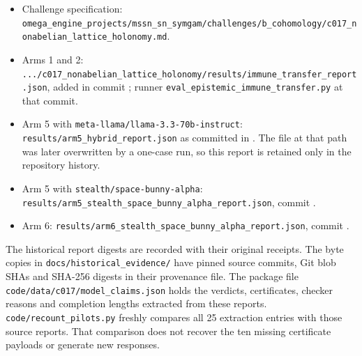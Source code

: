 \documentclass[
  11pt,
]{article}
\providecommand{\tightlist}{%
  \setlength{\itemsep}{0pt}\setlength{\parskip}{0pt}}
\begin{document}
\begin{itemize}
\tightlist
\item
  Challenge specification:
  \texttt{omega\_\allowbreak{}engine\_\allowbreak{}projects/\allowbreak{}mssn\_\allowbreak{}sn\_\allowbreak{}symgam/\allowbreak{}challenges/\allowbreak{}b\_\allowbreak{}cohomology/\allowbreak{}c017\_\allowbreak{}nonabelian\_\allowbreak{}lattice\_\allowbreak{}holonomy.md}.
\item
  Arms 1 and 2:
  \texttt{.../\allowbreak{}c017\_\allowbreak{}nonabelian\_\allowbreak{}lattice\_\allowbreak{}holonomy/\allowbreak{}results/\allowbreak{}immune\_\allowbreak{}transfer\_\allowbreak{}report.json},
  added in commit
  \texttt{}; runner
  \texttt{eval\_\allowbreak{}epistemic\_\allowbreak{}immune\_\allowbreak{}transfer.py}
  at that commit.
\item
  Arm 5 with
  \texttt{meta-\allowbreak{}llama/\allowbreak{}llama-\allowbreak{}3.3-\allowbreak{}70b-\allowbreak{}instruct}:
  \texttt{results/\allowbreak{}arm5\_\allowbreak{}hybrid\_\allowbreak{}report.json}
  as committed in
  \texttt{}. The file
  at that path was later overwritten by a one-case run, so this report
  is retained only in the repository history.
\item
  Arm 5 with
  \texttt{stealth/\allowbreak{}space-\allowbreak{}bunny-\allowbreak{}alpha}:
  \texttt{results/\allowbreak{}arm5\_\allowbreak{}stealth\_\allowbreak{}space\_\allowbreak{}bunny\_\allowbreak{}alpha\_\allowbreak{}report.json},
  commit \texttt{}.
\item
  Arm 6:
  \texttt{results/\allowbreak{}arm6\_\allowbreak{}stealth\_\allowbreak{}space\_\allowbreak{}bunny\_\allowbreak{}alpha\_\allowbreak{}report.json},
  commit \texttt{}.
\end{itemize}

The historical report digests are recorded with their original receipts.
The byte copies in
\texttt{docs/\allowbreak{}historical\_\allowbreak{}evidence/\allowbreak{}}
have pinned source commits, Git blob SHAs and SHA-256 digests in their
provenance file. The package file
\texttt{code/\allowbreak{}data/\allowbreak{}c017/\allowbreak{}model\_\allowbreak{}claims.json}
holds the verdicts, certificates, checker reasons and completion lengths
extracted from these reports.
\texttt{code/\allowbreak{}recount\_\allowbreak{}pilots.py} freshly
compares all 25 extraction entries with those source reports. That
comparison does not recover the ten missing certificate payloads or
generate new responses.
\end{document}
